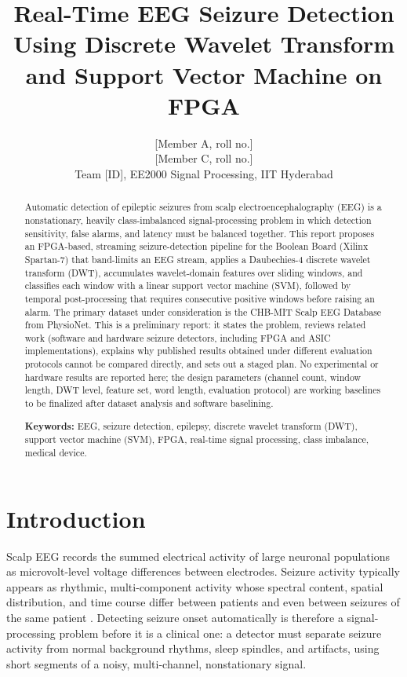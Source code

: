 \documentclass[10pt,twocolumn,letterpaper]{article}
\title{Real-Time EEG Seizure Detection Using Discrete Wavelet Transform\\
and Support Vector Machine on FPGA}
\author{[Member A, roll no.] \quad [Member B, roll no.]\\[2pt]
[Member C, roll no.] \quad [Member D, roll no.]\\
Team [ID], EE2000 Signal Processing, IIT Hyderabad}
\begin{document}
\maketitle

\begin{abstract}
Automatic detection of epileptic seizures from scalp
electroencephalography (EEG) is a nonstationary, heavily class-imbalanced
signal-processing problem in which detection sensitivity, false alarms,
and latency must be balanced together. This report proposes an
FPGA-based, streaming seizure-detection pipeline for the Boolean Board
(Xilinx Spartan-7) that band-limits an EEG stream, applies a
Daubechies-4 discrete wavelet transform (DWT), accumulates wavelet-domain
features over sliding windows, and classifies each window with a linear
support vector machine (SVM), followed by temporal post-processing that
requires consecutive positive windows before raising an alarm. The
primary dataset under consideration is the CHB-MIT Scalp EEG Database
from PhysioNet. This is a preliminary report: it states the problem,
reviews related work (software and hardware seizure detectors, including
FPGA and ASIC implementations), explains why published results obtained
under different evaluation protocols cannot be compared directly, and
sets out a staged plan. No experimental or hardware results are reported
here; the design parameters (channel count, window length, DWT level,
feature set, word length, evaluation protocol) are working baselines to
be finalized after dataset analysis and software baselining.

\medskip
\noindent\textbf{Keywords:} EEG, seizure detection, epilepsy, discrete
wavelet transform (DWT), support vector machine (SVM), FPGA, real-time
signal processing, class imbalance, medical device.
\end{abstract}

\section{Introduction}
\label{sec:intro}

Scalp EEG records the summed electrical activity of large neuronal
populations as microvolt-level voltage differences between electrodes.
Seizure activity typically appears as rhythmic, multi-component activity
whose spectral content, spatial distribution, and time course differ
between patients and even between seizures of the same patient
\cite{shoeb2010icml}. Detecting seizure onset automatically is therefore
a signal-processing problem before it is a clinical one: a detector must
separate seizure activity from normal background rhythms, sleep
spindles, and artifacts, using short segments of a noisy, multi-channel,
nonstationary signal.
\end{document}
